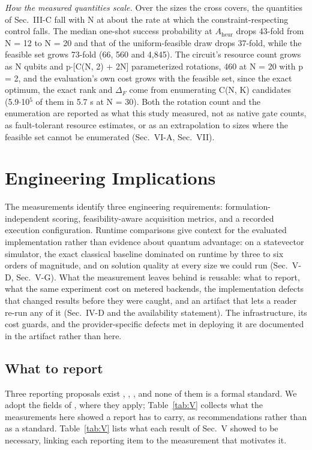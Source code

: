 \documentclass[journal]{IEEEtran}
\begin{document}
\textit{How the measured quantities scale.} Over the sizes the cross covers, the quantities of Sec.~III-C fall with N at about the rate at which the constraint-respecting control falls. The median one-shot success probability at $A_{\mathrm{heur}}$ drops 43-fold from N = 12 to N = 20 and that of the uniform-feasible draw drops 37-fold, while the feasible set grows 73-fold (66, 560 and 4,845). The circuit's resource count grows as N qubits and p$\cdot$[C(N, 2) + 2N] parameterized rotations, 460 at N = 20 with p = 2, and the evaluation's own cost grows with the feasible set, since the exact optimum, the exact rank and $\Delta_{F}$ come from enumerating C(N, K) candidates (5.9$\cdot$10$^{5}$ of them in 5.7 s at N = 30). Both the rotation count and the enumeration are reported as what this study measured, not as native gate counts, as fault-tolerant resource estimates, or as an extrapolation to sizes where the feasible set cannot be enumerated (Sec.~VI-A, Sec.~VII).


\section{Engineering Implications}


The measurements identify three engineering requirements: formulation-independent scoring, feasibility-aware acquisition metrics, and a recorded execution configuration. Runtime comparisons give context for the evaluated implementation rather than evidence about quantum advantage: on a statevector simulator, the exact classical baseline dominated on runtime by three to six orders of magnitude, and on solution quality at every size we could run (Sec.~V-D, Sec.~V-G). What the measurement leaves behind is reusable: what to report, what the same experiment cost on metered backends, the implementation defects that changed results before they were caught, and an artifact that lets a reader re-run any of it (Sec.~IV-D and the availability statement). The infrastructure, its cost guards, and the provider-specific defects met in deploying it are documented in the artifact rather than here.


\subsection{What to report}


Three reporting proposals exist \cite{ref22}, \cite{ref23}, \cite{ref24}, and none of them is a formal standard. We adopt the fields of \cite{ref22}, \cite{ref23} where they apply; Table~\ref{tab:V} collects what the measurements here showed a report has to carry, as recommendations rather than as a standard. Table~\ref{tab:V} lists what each result of Sec.~V showed to be necessary, linking each reporting item to the measurement that motivates it.
\end{document}
